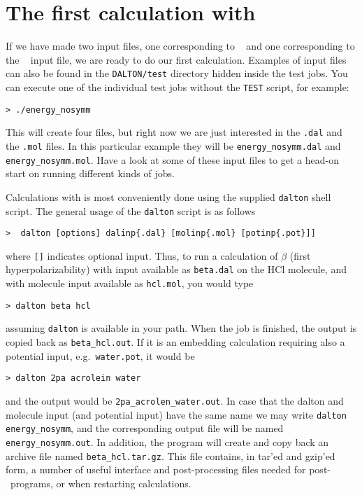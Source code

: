 \section{The first calculation with {\dalton}}\label{sec:firstcalc}

If we have made two input files, one corresponding to
\dalinp\  and one corresponding to the \molinp\
 input file, we
are ready to do our first calculation. Examples of input files can
also be found in the \verb|DALTON/test| directory hidden inside the
test jobs. You can execute one of the individual test jobs
without the \verb|TEST| script, for example:
\begin{verbatim}
> ./energy_nosymm
\end{verbatim}
This will create four files, but right now we are just interested in
the \verb|.dal| and the \verb|.mol| files. In this particular example
they will be \verb|energy_nosymm.dal| and
\verb|energy_nosymm.mol|. Have a look at some of these input files to
get a head-on start on running different kinds of {\dalton} jobs.

Calculations with {\dalton} is most conveniently done using the
supplied \verb|dalton| shell script.
The general usage of the \verb|dalton| script is as follows
\begin{verbatim}
>  dalton [options] dalinp{.dal} [molinp{.mol} [potinp{.pot}]]
\end{verbatim}
where \verb|[]| indicates optional input.
Thus, to run a calculation of $\beta$ (first
hyperpolarizability) 
with input available as \verb|beta.dal| on the HCl molecule, and with
molecule input available as \verb|hcl.mol|, you would type
\begin{verbatim}
> dalton beta hcl
\end{verbatim}
assuming \verb|dalton| is available in your path. When the job is
finished, the output is copied back as \verb|beta_hcl.out|. If it is an embedding
calculation requiring also a potential input, e.g.\ \verb|water.pot|, it would be
\begin{verbatim}
> dalton 2pa acrolein water
\end{verbatim}
and the output would be \verb|2pa_acrolen_water.out|. In case that the dalton and molecule
input (and potential input) have the same name we may write \verb|dalton energy_nosymm|,
and the corresponding output file will be named \verb|energy_nosymm.out|. In addition, the 
program will create and copy back an archive file named \verb|beta_hcl.tar.gz|. This file 
contains, in tar'ed and gzip'ed form, a number of useful interface and
post-processing files needed for post-\dalton\ programs, or when
restarting calculations.

